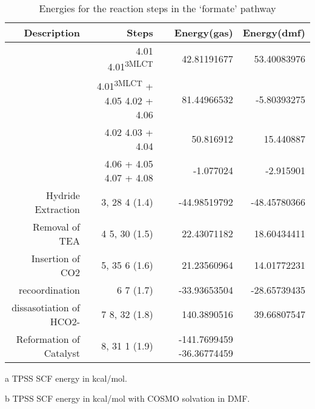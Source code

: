 \begin{table}[!htb]
\centering
 \begin{threeparttable}
  \caption{Energies for the reaction steps in the `formate' pathway}
    \begin{tabular}{rrrr}
    \toprule
    Description & Steps & Energy(gas)\tnote{a} & Energy(dmf)\tnote{b} \\
    \midrule
    & 4.01 \ce{->} 4.01\textsuperscript{3MLCT} & 42.81191677 &	53.40083976 \\
    & 4.01\textsuperscript{3MLCT} + 4.05 \ce{->} 4.02 + 4.06 & 81.44966532	& -5.80393275 \\
    & 4.02 \ce{->} 4.03 + 4.04 & 50.816912 & 15.440887 \\
    & 4.06 + 4.05 \ce{->} 4.07 + 4.08 & -1.077024 & -2.915901 \\
    \midrule
    Hydride Extraction & 3, 28 \ce{->} 4 (1.4) & -44.98519792 & -48.45780366 \\
    Removal of TEA & 4 \ce{->} 5, 30 (1.5) & 22.43071182 & 18.60434411 \\
    Insertion of CO2 & 5, 35 \ce{->} 6 (1.6) & 21.23560964 & 14.01772231 \\
    recoordination & 6 \ce{->} 7 (1.7) & -33.93653504 & -28.65739435 \\
    dissasotiation of HCO2- & 7 \ce{->} 8, 32 (1.8) & 140.3890516 & 39.66807547 \\
    Reformation of Catalyst & 8, 31 \ce{->} 1 (1.9) & -141.7699459 -36.36774459 \\
    \bottomrule
    \end{tabular}%
    \begin{tablenotes}
    \item [a] TPSS SCF energy in kcal/mol.
    \item [b] TPSS SCF energy in kcal/mol with COSMO solvation in DMF.
    \end{tablenotes}
  \label{tab.formrxn}%
 \end{threeparttable}
\end{table}%

